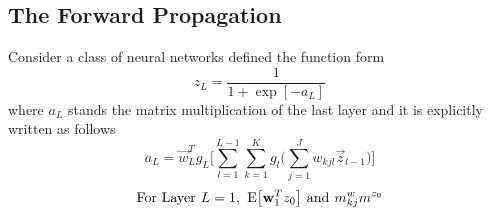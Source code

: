 \documentclass[]{article}
\begin{document}
\subsection{The Forward Propagation}
Consider a class of neural networks defined the function form 
\begin{equation}
	z_L = \frac{1}{1 + \exp[-a_L]}
	\label{equ:61}
\end{equation}
where $a_L$ stands the matrix multiplication of the last layer and it is explicitly written as follows
\begin{equation}
	a_L = \vec{w}_L^Tg_L\bigg[\sum_{l = 1}^{L-1}\sum_{k = 1}^{K}g_l\bigg(\sum_{j=1}^{J}w_{kjl}\vec{z}_{l-1}\bigg)\bigg] 
	\label{equ:62}
\end{equation}
\begin{equation}
	\text{For Layer} \hspace{0.05in} L=1, \hspace{0.05in} \mathrm{E}\big[\mathbf{w}_1^Tz_0\big] \hspace{0.05in} \text{and} \hspace{0.05in} m_{kj}^w m^{z_0}  
	\label{equ:63}
\end{equation}
\end{document}
